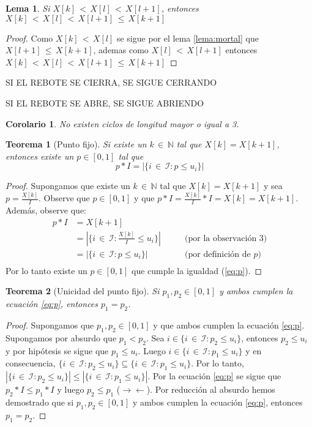 \documentclass{article}
\newtheorem{teor}{Teorema}
\newtheorem{coro}{Corolario}
\newtheorem{lema}{Lema}
\begin{document}
\begin{lema}\label{lema3}
Si $X[k]\,{<}\,X[l]\,{<}\,X[l{+}1]$, entonces $X[k]\,{<}\,X[l]\,{<}\,X[l{+}1]\,{\leq}\,X[k{+}1]$
\end{lema}

\begin{proof}
Como $X[k]\,{<}\,X[l]$ se sigue por el lema \ref{lema:mortal} que $X[l{+}1]\,{\leq}\,X[k{+}1]$, ademas como $X[l]\,{<}\,X[l{+}1]$ entonces $X[k]\,{<}\,X[l]\,{<}\,X[l{+}1]\,{\leq}\,X[k{+}1]$
\end{proof}

\centerline{SI EL REBOTE SE CIERRA, SE SIGUE CERRANDO} 
\centerline{SI EL REBOTE SE ABRE, SE SIGUE ABRIENDO}

\begin{coro}\label{coro:ciclos}
No existen ciclos de longitud mayor o igual a 3.
\end{coro}

\begin{teor}[Punto fijo]
Si existe un $k\,{\in}\,\mathbb{N}$ tal que $X[k]=X[k{+}1]$, entonces existe un $p\in[0,1]$ tal que
\begin{equation}\label{eq:p}
p*I=|\{i\,{\in}\,\mathcal{I}:p\leq u_i\}|
\end{equation}
\end{teor}
\begin{proof}

Supongamos que existe un $k\,{\in}\,\mathbb{N}$ tal que $X[k]=X[k{+}1]$ y sea $p=\frac{X[k]}{I}$. Observe que $p\in[0,1]$ y que $p*I=\frac{X[k]}{I}*I=X[k]=X[k{+}1]$. Además, observe que:
\begin{align*}
p*I&=X[k{+}1]\\
&=|\{i\,{\in}\,\mathcal{I}:\frac{X[k]}{I}\leq u_i\}| &\qquad\mbox{(por la observación 3)}\\
&=|\{i\,{\in}\,\mathcal{I}:p\leq u_i\}| &\qquad\mbox{(por definición de $p$)}\\
\end{align*}
Por lo tanto existe un $p\in[0,1]$ que cumple la igualdad (\ref{eq:p}).
\end{proof}

\begin{teor}[Unicidad del punto fijo]
Si $p_1,p_2\in[0,1]$ y ambos cumplen la ecuación \ref{eq:p}, entonces $p_1=p_2$.
\end{teor}
\begin{proof}
Supongamos que $p_1,p_2\in[0,1]$ y que ambos cumplen la ecuación \ref{eq:p}. Supongamos por absurdo que $p_1<p_2$. Sea $i\in\{i\,{\in}\,\mathcal{I}:p_2\leq u_i\}$, entonces $p_2\leq u_i$ y por hipótesis se sigue que $p_1\leq u_i$. Luego $i\in\{i\,{\in}\,\mathcal{I}:p_1\leq u_i\}$ y en consecuencia, $\{i\,{\in}\,\mathcal{I}:p_2\leq u_i\}\subseteq \{i\,{\in}\,\mathcal{I}:p_1\leq u_i\}$. Por lo tanto, $|\{i\,{\in}\,\mathcal{I}:p_2\leq u_i\}|\leq |\{i\,{\in}\,\mathcal{I}:p_1\leq u_i\}|$. Por la ecuación \ref{eq:p} se sigue que $p_2*I\leq p_1*I$ y luego $p_2\leq p_1$ ($\to\leftarrow$). Por reducción al absurdo hemos demostrado que si $p_1,p_2\in[0,1]$ y ambos cumplen la ecuación \ref{eq:p}, entonces $p_1=p_2$.
\end{proof}
\end{document}
